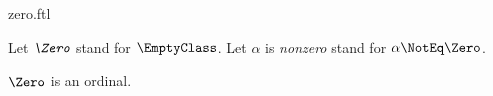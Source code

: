 \documentclass{stex}
\begin{document}
\begin{smodule}{zero.ftl}



\begin{convention*}[forthel,for=Zero]
  Let $\emph{\Zero}$ stand for $\EmptyClass$.
  Let $\alpha$ is \emph{nonzero} stand for $\alpha \NotEq \Zero$.
\end{convention*}

\begin{proposition*}[forthel]
  $\Zero$ is an ordinal.
\end{proposition*}

\end{smodule}
\end{document}
